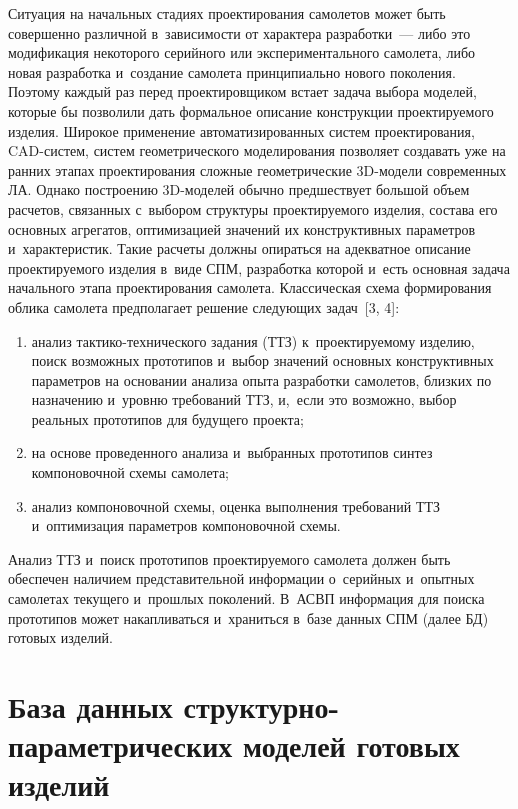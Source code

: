 \begin{multicols}{2}
  Ситуация на начальных стадиях проектирования самолетов может быть 
совершенно различной в~за\-ви\-си\-мости от характера разработки~--- либо это 
модификация некоторого серийного или экспериментального самолета, либо 
новая разработка и~создание самолета принципиально нового поколения. 
Поэтому каждый раз перед проектировщиком встает задача выбора моделей, 
которые бы позволили дать формальное описание конструкции проектируемого 
изделия. Широкое применение автоматизированных сис\-тем проектирования, 
CAD-сис\-тем, сис\-тем геометрического моделирования позволяет создавать 
уже на ранних этапах проектирования слож\-ные гео\-мет\-ри\-че\-ские 3D-мо\-де\-ли 
современных ЛА. Однако по\-стро\-ению 3D-мо\-де\-лей 
обычно пред\-шест\-ву\-ет большой объем расчетов, связанных с~выбором 
структуры про\-ек\-ти\-ру\-емо\-го изделия, со\-ста\-ва его основных агрегатов, 
оптимизацией значений их конструктивных па\-ра\-мет\-ров и~характеристик. 
Такие расчеты должны опираться на адекватное описание про\-ек\-ти\-ру\-емо\-го 
изделия в~виде СПМ, разработка которой и~есть 
основная задача начального этапа проектирования самолета. Классическая 
схема формирования облика самолета предполагает решение сле\-ду\-ющих 
задач~[3, 4]:
  \begin{enumerate}[(1)]
\item  анализ тактико-тех\-ни\-че\-ско\-го задания (ТТЗ) к~проектируемому изделию, 
поиск возможных прототипов и~выбор значений основных конструктивных 
параметров на основании анализа опыта разработки самолетов, близ\-ких по 
назначению и~уровню требований ТТЗ, и,~если это воз\-мож\-но, выбор 
реальных прототипов для будущего проекта;
  \item на основе проведенного анализа и~выбранных прототипов синтез 
компоновочной схемы самолета;
  \item  анализ компоновочной схемы, оценка выполнения требований ТТЗ 
и~оптимизация па\-ра\-мет\-ров компоновочной схемы.
  \end{enumerate}
  
  Анализ ТТЗ и~поиск прототипов проектируемого самолета должен быть 
обеспечен наличием пред\-ста\-ви\-тель\-ной информации о~серийных и~опытных 
самолетах текущего и~прош\-лых поколений. В~\mbox{АСВП} информация для поиска 
прототипов может накапливаться и~храниться в~базе данных  
СПМ  (далее БД) готовых изделий.

  
\section{База данных структурно-параметрических моделей 
готовых изделий}


\end{multicols}
